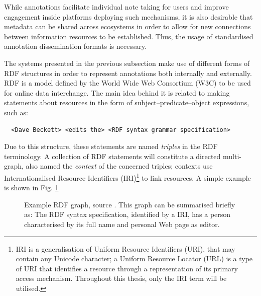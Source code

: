 
While annotations facilitate individual note taking for users and improve
engagement inside platforms deploying such mechanisms, it is also desirable
that metadata can be shared across ecosystems in order to allow for new
connections between information resources to be established. Thus, the usage of
standardised annotation dissemination formats is necessary.

The systems presented in the previous subsection make use of different forms of
RDF structures in order to represent annotations both internally and
externally.  RDF \cite{ref:rdf} is a model defined by the World Wide Web
Consortium (W3C) to be used for online data interchange. The main idea behind
it is related to making statements about resources in the form of
subject--predicate--object expressions, such as:

\begin{verbatim}
  <Dave Beckett> <edits the> <RDF syntax grammar specification>
\end{verbatim}

Due to this structure, these statements are named \textit{triples} in the RDF
terminology.  A collection of RDF statements will constitute a directed
multi-graph, also named the \textit{context} of the concerned triples; contexts
use Internationalised Resource Identifiers (IRI)\footnote{IRI is a
generalisation of Uniform Resource Identifiers (URI), that may contain any
Unicode character; a Uniform Resource Locator (URL) is a type of URI that
identifies a resource through a representation of its primary access
mechanism. Throughout this thesis, only the IRI term will be utilised.} to
link resources. A simple example is shown in Fig. \ref{fig:rdf}

\begin{figure}[!ht]
  \centering
  \caption[Example RDF graph]
          {Example RDF graph, source \cite{ref:rdfsyntax}. This graph
           can be summarised briefly as: The RDF syntax specification,
           identified by a IRI, has a person characterised by its full name and
           personal Web page as editor.}
  \label{fig:rdf}
\end{figure}


